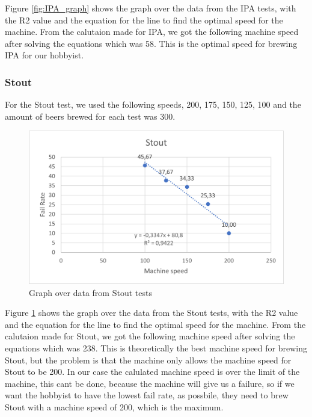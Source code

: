 Figure \ref{fig:IPA_graph} shows the graph over the data from the IPA tests, with the R2 value and the equation for the line to find the optimal speed for the machine. \newline
From the calutaion made for IPA, we got the following machine speed after solving the equations which was 58. This is the optimal speed for brewing IPA for our hobbyist. \newline

\subsubsection{Stout}
For the Stout test, we used the following speeds, 200, 175, 150, 125, 100 and the amount of beers brewed for each test was 300.

\begin{center}
    \centering
    \begin{figure}[H]
        \includegraphics[width=1\textwidth]{img/Stout_graph.png}
        \caption{Graph over data from Stout tests}
        \label{fig:Stout_graph}
    \end{figure}
\end{center}

Figure \ref{fig:Stout_graph} shows the graph over the data from the Stout tests, with the R2 value and the equation for the line to find the optimal speed for the machine. \newline
From the calutaion made for Stout, we got the following machine speed after solving the equations which was 238. This is theoretically the best machine speed for brewing Stout, but the problem is that the machine only allows the machine speed for Stout to be 200.
In our case the calulated machine speed is over the limit of the machine, this cant be done, because the machine will give us a failure, so if we want the hobbyist to have the lowest fail rate, as possbile, they need to brew Stout with a machine speed of 200, which is the maximum. \newline

